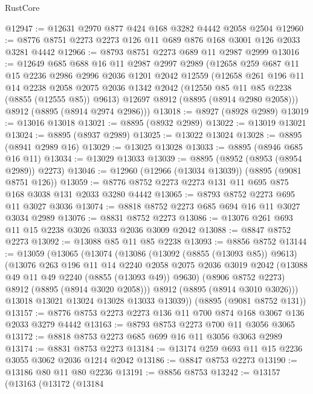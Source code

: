 \begin{lexlean}{RustCore}
\begin{coremodule}
@12947 := @12631 @2970 @877 @424 @168 @3282 @4442 @2058 @2504
@12960 := @8776 @8751 @2273 @2273 @126 @11 @689 @876 @168 @3001 @126 @2033 @3281 @4442
@12966 := @8793 @8751 @2273 @689 @11 @2987 @2999
@13016 := @12649
    @685
    @688
    @16
    @11
    @2987
    @2997
    @2989
    (@12658
      @259
      @687
      @11
      @15
      @2236
      @2986
      @2996
      @2036
      @1201
      @2042
      @12559
      (@12658
        @261
        @196
        @11
        @14
        @2238
        @2058
        @2075
        @2036
        @1342
        @2042
        (@12550 @85 @11 @85 @2238 (@8855 (@12555 @85)) @9613)
        @12697
        @8912
        (@8895 (@8914 @2980 @2058)))
      @8912
      (@8895 (@8914 @2974 @2986)))
@13018 := @8927 (@8928 @2989)
@13019 := @13016 @13018
@13021 := @8895 (@8932 @2989)
@13022 := @13019 @13021
@13024 := @8895 (@8937 @2989)
@13025 := @13022 @13024
@13028 := @8895 (@8941 @2989 @16)
@13029 := @13025 @13028
@13033 := @8895 (@8946 @685 @16 @11)
@13034 := @13029 @13033
@13039 := @8895 (@8952 (@8953 (@8954 @2989)) @2273)
@13046 := @12960 (@12966 (@13034 @13039)) (@8895 (@9081 @8751 @126))
@13059 := @8776 @8752 @2273 @2273 @131 @11 @695 @875 @168 @3038 @131 @2033 @3280 @4442
@13065 := @8793 @8752 @2273 @695 @11 @3027 @3036
@13074 := @8818 @8752 @2273 @685 @694 @16 @11 @3027 @3034 @2989
@13076 := @8831 @8752 @2273
@13086 := @13076 @261 @693 @11 @15 @2238 @3026 @3033 @2036 @3009 @2042
@13088 := @8847 @8752 @2273
@13092 := @13088 @85 @11 @85 @2238
@13093 := @8856 @8752
@13144 := @13059
    (@13065
      (@13074
        (@13086
          (@13092 (@8855 (@13093 @85)) @9613)
          (@13076
            @263
            @196
            @11
            @14
            @2240
            @2058
            @2075
            @2036
            @3019
            @2042
            (@13088 @49 @11 @49 @2240 (@8855 (@13093 @49)) @9630)
            (@8906 @8752 @2273)
            @8912
            (@8895 (@8914 @3020 @2058)))
          @8912
          (@8895 (@8914 @3010 @3026)))
        @13018
        @13021
        @13024
        @13028
        @13033
        @13039))
    (@8895 (@9081 @8752 @131))
@13157 := @8776 @8753 @2273 @2273 @136 @11 @700 @874 @168 @3067 @136 @2033 @3279 @4442
@13163 := @8793 @8753 @2273 @700 @11 @3056 @3065
@13172 := @8818 @8753 @2273 @685 @699 @16 @11 @3056 @3063 @2989
@13174 := @8831 @8753 @2273
@13184 := @13174 @259 @693 @11 @15 @2236 @3055 @3062 @2036 @1214 @2042
@13186 := @8847 @8753 @2273
@13190 := @13186 @80 @11 @80 @2236
@13191 := @8856 @8753
@13242 := @13157
    (@13163
      (@13172
        (@13184

\end{coremodule}
\end{lexlean}
